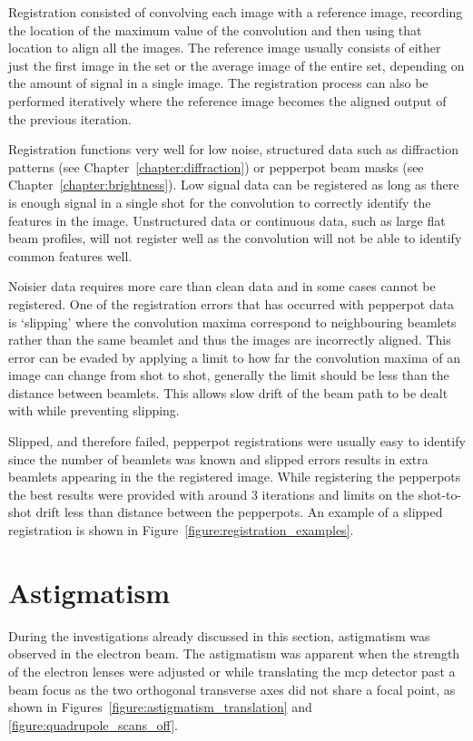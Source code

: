Registration consisted of convolving each image with a reference image, recording the location of the maximum value of the convolution and then using that location to align all the images.
The reference image usually consists of either just the first image in the set or the average image of the entire set, depending on the amount of signal in a single image.
The registration process can also be performed iteratively where the reference image becomes the aligned output of the previous iteration.

Registration functions very well for low noise, structured data such as diffraction patterns (see Chapter~\ref{chapter:diffraction}) or pepperpot beam masks (see Chapter~\ref{chapter:brightness}).
Low signal data can be registered as long as there is enough signal in a single shot for the convolution to correctly identify the features in the image.
Unstructured data or continuous data, such as large flat beam profiles, will not register well as the convolution will not be able to identify common features well.

Noisier data requires more care than clean data and in some cases cannot be registered.
One of the registration errors that has occurred with pepperpot data is `slipping' where the convolution maxima correspond to neighbouring beamlets rather than the same beamlet and thus the images are incorrectly aligned.
This error can be evaded by applying a limit to how far the convolution maxima of an image can change from shot to shot, generally the limit should be less than the distance between beamlets.
This allows slow drift of the beam path to be dealt with while preventing slipping.

Slipped, and therefore failed, pepperpot registrations were usually easy to identify since the number of beamlets was known and slipped errors results in extra beamlets appearing in the the registered image.
While registering the pepperpots the best results were provided with around 3 iterations and limits on the shot-to-shot drift less than distance between the pepperpots.
An example of a slipped registration is shown in Figure~\ref{figure:registration_examples}.

\section{Astigmatism}\label{section:quadrupole}

During the investigations already discussed in this section, astigmatism was observed in the electron beam.
The astigmatism was apparent when the strength of the electron lenses were adjusted or while translating the \gls{mcp} detector past a beam focus as the two orthogonal transverse axes did not share a focal point, as shown in Figures~\ref{figure:astigmatism_translation} and \ref{figure:quadrupole_scans_off}.

